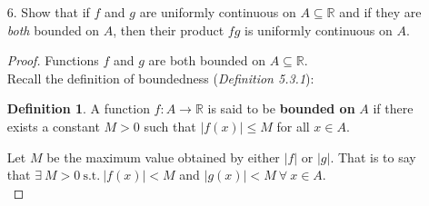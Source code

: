 \documentclass[12pt,letterpaper]{article}
\newcommand{\st}{\ \text{s.t.}\ }
\newcommand{\R}{\mathbb{R}}
\theoremstyle{case}
\theoremstyle{definition}
\newtheorem{definition}{Definition}[section]
\begin{document}
\begin{enumerate}
\begin{enumerate}
				\begin{proof}
					Recall the definition of uniform continuity:\\
					
					We say a function $f$ is continuous if 
					\[\forall\ \varepsilon > 0,\ \exists\ \delta > 0 \st |f(x)-f(y)|<\varepsilon\ \forall\ x,y \in \R \st |x-y|<\delta\]
					Let $\varepsilon > 0$ be given, and choose $\delta_1,\ \delta_2 >0$ such that:
					\begin{align*}
						&|f(x)-f(y)|<\frac{\varepsilon}{2} &\text{for any    } |x-y|<\delta_1 \\
						&|g(x)-g(y)|<\frac{\varepsilon}{2} &\text{for any    } |x-y|<\delta_2
					\end{align*}
					Choose $\delta=\min \{\delta_1, \delta_2\}$. Then $\forall\ x,y \in \R$:
					\[|x-y|<\delta \implies |f(x)+g(x)-f(y)-g(y)|<|f(x)-f(y)|+|g(x)-g(y)|<\frac{\varepsilon}{2}+\frac{\varepsilon}{2}=\varepsilon\]
					Therefore we have shown that $\forall\ |x-y|<\delta\ |(f+g)(x)-(f+g)(y)|<\varepsilon$.\\
					
					$\therefore\ f+g$ is uniformly continuous.
				\end{proof}
				
				\item[6.] Show that if $f$ and $g$ are uniformly continuous on $A \subseteq \R$ and if they are \textit{both} bounded on $A$, then their product $fg$ is uniformly continuous on $A$.\\
				
				\begin{proof}
					Functions $f$ and $g$ are both bounded on $A \subseteq \R$.\\
					
					Recall the definition of boundedness (\textit{Definition 5.3.1}):
					\theoremstyle{definition}
					\begin{definition}
						A function $f:A \rightarrow \R$ is said to be \textbf{bounded on} $A$ if there exists a constant $M > 0$ such that $|f(x)| \leq M$ for all $x \in A$.
					\end{definition}
					Let $M$ be the maximum value obtained by either $|f|$ or $|g|$. That is to say that $\exists\ M > 0 \st |f(x)| < M$ and $|g(x)|<M\ \forall\ x \in A$.\\
					

\end{proof}
\end{enumerate}
\end{enumerate}
\end{document}
